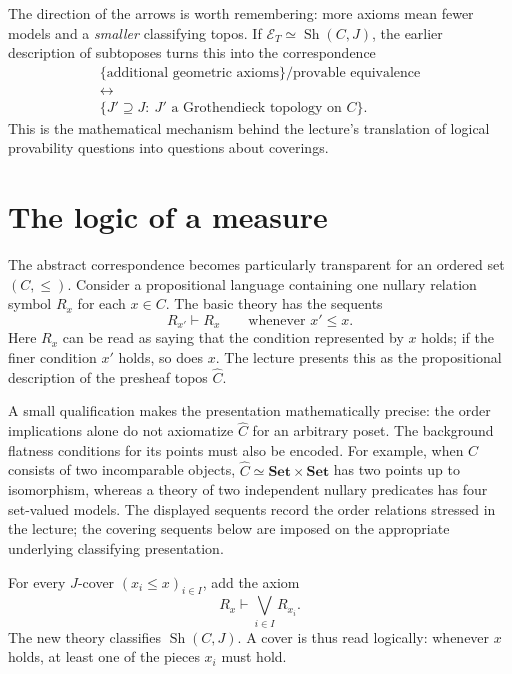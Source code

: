 The direction of the arrows is worth remembering: more axioms mean fewer models and a \emph{smaller} classifying topos. If \(\mathcal E_T\simeq\operatorname{Sh}(C,J)\), the earlier description of subtoposes turns this into the correspondence
\[
 \begin{gathered}
 \{\text{additional geometric axioms}\}/\text{provable equivalence}\\
 \longleftrightarrow\\
 \{J'\supseteq J:\ J'\text{ a Grothendieck topology on }C\}.
 \end{gathered}
\]
This is the mathematical mechanism behind the lecture's translation of logical provability questions into questions about coverings.

\section{The logic of a measure}

The abstract correspondence becomes particularly transparent for an ordered set \((C,\leq)\). Consider a propositional language containing one nullary relation symbol \(R_x\) for each \(x\in C\). The basic theory has the sequents
\[
 R_{x'}\vdash R_x
 \qquad\text{whenever }x'\leq x.
\]
Here \(R_x\) can be read as saying that the condition represented by \(x\) holds; if the finer condition \(x'\) holds, so does \(x\). The lecture presents this as the propositional description of the presheaf topos \(\widehat C\).

A small qualification makes the presentation mathematically precise: the order implications alone do not axiomatize \(\widehat C\) for an arbitrary poset. The background flatness conditions for its points must also be encoded. For example, when \(C\) consists of two incomparable objects, \(\widehat C\simeq\mathbf{Set}\times\mathbf{Set}\) has two points up to isomorphism, whereas a theory of two independent nullary predicates has four set-valued models. The displayed sequents record the order relations stressed in the lecture; the covering sequents below are imposed on the appropriate underlying classifying presentation.

For every \(J\)-cover \((x_i\leq x)_{i\in I}\), add the axiom
\begin{equation}
 R_x\vdash\bigvee_{i\in I}R_{x_i}.
 \label{eq:N20261026-cover-sequent}
\end{equation}
The new theory classifies \(\operatorname{Sh}(C,J)\). A cover is thus read logically: whenever \(x\) holds, at least one of the pieces \(x_i\) must hold.

